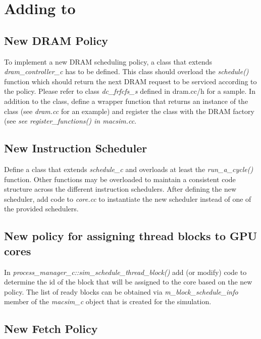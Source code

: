 \chapter{Adding to \SIM}
\label{sec:add_macsim}

\section{New DRAM Policy}

To implement a new DRAM scheduling policy, a class that extends
\textit{dram\_controller\_c} has to be defined. This class should overload the
\textit{schedule()} function which should return the next DRAM request to be
serviced according to the policy. Please refer to class \textit{dc\_frfcfs\_s}
defined in dram.cc/h for a sample. In addition to the class, define a wrapper
function that returns an instance of the class (see \textit{dram.cc} for an
    example) and register the class with the DRAM factory (see \textit{see
      register\_functions() in \textit{macsim.cc}}. 


\section{New Instruction Scheduler}

Define a class that extends \textit{schedule\_c} and overloads at least the
\textit{run\_a\_cycle()} function. Other functions may be overloaded to
maintain a consistent code structure across the different instruction
schedulers. After defining the new scheduler, add code to \textit{core.cc} to
instantiate the new scheduler instead of one of the provided schedulers.

\section{New policy for assigning thread blocks to GPU cores}

In \textit{process\_manager\_c::sim\_schedule\_thread\_block()} add (or modify)
code to determine the id of the block that will be assigned to the core based
on the new policy. The list of ready blocks can be obtained via
\textit{m\_block\_schedule\_info} member of the \textit{macsim\_c} object that
is created for the simulation.


\section{New Fetch Policy}
\label{sec:modify:fetch}


